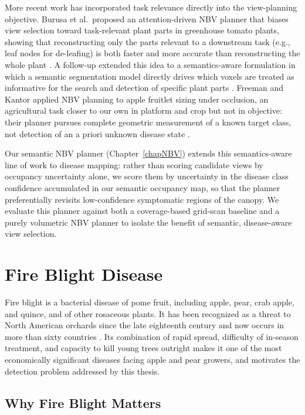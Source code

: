 More recent work has incorporated task relevance directly into the
view-planning objective.
Burusa et al.\ proposed an attention-driven NBV planner that biases view
selection toward task-relevant plant parts in greenhouse tomato plants,
showing that reconstructing only the parts relevant to a downstream task
(e.g., leaf nodes for de-leafing) is both faster and more accurate than
reconstructing the whole plant \cite{Burusa2024AttentionDrivenNBVPlantParts}.
A follow-up extended this idea to a semantics-aware formulation in which a
semantic segmentation model directly drives which voxels are treated as
informative for the search and detection of specific plant parts
\cite{Burusa2024SemanticsAwareNBVPlantParts}.
Freeman and Kantor applied NBV planning to apple fruitlet sizing under
occlusion, an agricultural task closer to our own in platform and crop but not
in objective: their planner pursues complete geometric measurement of a known
target class, not detection of an a priori unknown disease state
\cite{Freeman2024AppleFruitletSizing}.

Our semantic NBV planner (Chapter~\ref{chapNBV}) extends this semantics-aware
line of work to disease mapping: rather than scoring candidate views by
occupancy uncertainty alone, we score them by uncertainty in the disease class
confidence accumulated in our semantic occupancy map, so that the planner
preferentially revisits low-confidence symptomatic regions of the canopy.
We evaluate this planner against both a coverage-based grid-scan baseline and
a purely volumetric NBV planner to isolate the benefit of semantic,
disease-aware view selection.

\section{Fire Blight Disease} \label{secFireBlight}

Fire blight is a bacterial disease of pome fruit, including apple, pear, crab
apple, and quince, and of other rosaceous plants.
It has been recognized as a threat to North American orchards since the late
eighteenth century and now occurs in more than sixty countries
\cite{van1979FireBlight, acimovic2026fireblight}.
Its combination of rapid spread, difficulty of in-season treatment, and
capacity to kill young trees outright makes it one of the most economically
significant diseases facing apple and pear growers, and motivates the
detection problem addressed by this thesis.

\subsection{Why Fire Blight Matters} \label{secWhyFireBlight}


